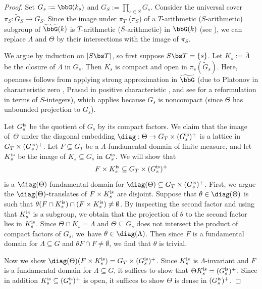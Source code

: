 \begin{proof} Set $G_s:=\bbG(k_s)$ and $G_S:=\prod_{s\in S} G_s$. Consider the universal cover $\pi_S:\widetilde{G}_S\to G_S$. Since the image under $\pi_T$ (\resp $\pi_S$) of a $T$-arithmetic (\resp $S$\nobreakdash-arith\-metic) subgroup of $\widetilde{\bbG}(k)$ is $T$-arithmetic (\resp $S$-arithmetic) in $\bbG(k)$ (see \eg \cite[I.3.2.9]{margulis-book}), we can replace $\Lambda$ and $\Theta$ by their intersections with the image of $\pi_S$.

We argue by induction on $|S\bs T|$, so first suppose $S\bs T=\{s\}$. Let $K_s:=\overline{\Lambda}$ be the closure of $\Lambda$ in $G_s$. Then $K_s$ is compact and open in $\pi_s(\widetilde{G}_s)$. Here, openness follows from applying strong approximation in $\widetilde{\bbG}$ (due to Platonov in characteristic zero \cite{platonov-strongapprox}, Prasad in positive characteristic \cite{prasad-strongapprox}, and see \cite[Prop.\,7.2(2)]{platonov-rapinchuk-book} for a reformulation in terms of $S$-integers), which applies because $G_s$ is noncompact (since $\Theta$ has unbounded projection to $G_s$).

Let $G_s^{\textup{is}}$ be the quotient of $G_s$ by its compact factors. We claim that the image of~$\Theta$ under the diagonal embedding $\diag:\Theta\to G_T \times (G_s^{\textup{is}})^+$ is a lattice in $G_T\times (G_s^{\textup{is}})^+$. Let $F\subseteq G_T$ be a $\Lambda$-fundamental domain of finite measure, and let $K_s^{\textup{is}}$ be the image of $K_s\subseteq G_s$ in $G_s^{\textup{is}}$. We will show that
\[
F\times K_s^{\textup{is}}\subseteq G_T\times (G_s^{\textup{is}})^+
\]
is a $\diag(\Theta)$-fundamental domain for $\diag(\Theta)\subseteq G_T\times (G_s^{\textup{is}})^+$. First, we argue the $\diag(\Theta)$-translates of $F\times K_s^{\textup{is}}$ are disjoint. Suppose that $\theta\in\diag(\Theta)$ is such that $\theta(F\cap K_s^{\textup{is}}) \cap (F\times K_s^{\textup{is}})\neq \emptyset$. By inspecting the second factor and using that $K_s^{\textup{is}}$ is a subgroup, we obtain that the projection of $\theta$ to the second factor lies in $K_s^{\textup{is}}$. Since $\Theta\cap K_s=\Lambda$ and $\Theta\subseteq G_s$ does not intersect the product of compact factors of $G_s$, we~have $\theta\in\diag(\Lambda)$. Then since $F$ is a fundamental domain for $\Lambda\subseteq G$ and $\theta F\cap F\neq\emptyset$, we find that $\theta$ is trivial.

Now we show $\diag(\Theta)(F\times K_s^{\textup{is}})=G_T\times (G_s^{\textup{is}})^+$. Since $K_s^{\textup{is}}$ is $\Lambda$-invariant and $F$ is a fundamental domain for $\Lambda\subseteq G$, it suffices to show that $\Theta K_s^{\textup{is}}= (G_s^{\textup{is}})^+$. Since in addition $K_s^{\textup{is}}\subseteq (G_s^{\textup{is}})^+$ is open, it suffices to show $\Theta$ is dense in $(G_s^{\textup{is}})^+$.


\end{proof}
